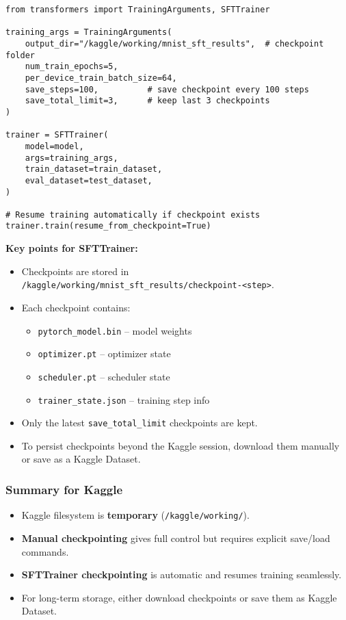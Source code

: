 \documentclass[a4paper, 12pt]{article}
\begin{document}
\begin{tcolorbox}[colback=yellow!5!white, colframe=yellow!75!black, title=Example: SFTTrainer Automatic Checkpointing]
\begin{verbatim}
from transformers import TrainingArguments, SFTTrainer

training_args = TrainingArguments(
    output_dir="/kaggle/working/mnist_sft_results",  # checkpoint folder
    num_train_epochs=5,
    per_device_train_batch_size=64,
    save_steps=100,          # save checkpoint every 100 steps
    save_total_limit=3,      # keep last 3 checkpoints
)

trainer = SFTTrainer(
    model=model,
    args=training_args,
    train_dataset=train_dataset,
    eval_dataset=test_dataset,
)

# Resume training automatically if checkpoint exists
trainer.train(resume_from_checkpoint=True)
\end{verbatim}
\end{tcolorbox}

\textbf{Key points for SFTTrainer:}
\begin{itemize}
    \item Checkpoints are stored in \texttt{/kaggle/working/mnist\_sft\_results/checkpoint-\textless step\textgreater}.
    \item Each checkpoint contains:
    \begin{itemize}
        \item \texttt{pytorch\_model.bin} – model weights
        \item \texttt{optimizer.pt} – optimizer state
        \item \texttt{scheduler.pt} – scheduler state
        \item \texttt{trainer\_state.json} – training step info
    \end{itemize}
    \item Only the latest \texttt{save\_total\_limit} checkpoints are kept.
    \item To persist checkpoints beyond the Kaggle session, download them manually or save as a Kaggle Dataset.
\end{itemize}

\subsubsection*{Summary for Kaggle}
\begin{tcolorbox}[colback=blue!5!white, colframe=blue!75!black, title=Summary]
\begin{itemize}
    \item Kaggle filesystem is \textbf{temporary} (\texttt{/kaggle/working/}).
    \item \textbf{Manual checkpointing} gives full control but requires explicit save/load commands.
    \item \textbf{SFTTrainer checkpointing} is automatic and resumes training seamlessly.
    \item For long-term storage, either download checkpoints or save them as Kaggle Dataset.
\end{itemize}
\end{tcolorbox}
\end{document}
